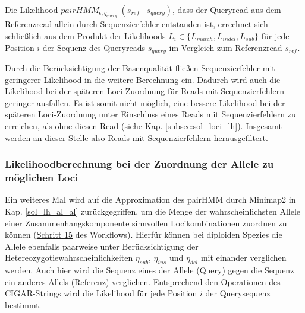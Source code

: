 Die Likelihood $ pairHMM_{\epsilon, q_{query}} \;(s_{ref}\;|\; s_{query}) $, dass der Queryread aus dem Referenzread allein durch Sequenzierfehler entstanden ist, errechnet sich schließlich aus dem Produkt der Likelihoods $ L_{i} \in \{L_{match}, L_{indel}, L_{sub}\} $ für jede Position $ i $ der Sequenz des Queryreads $ s_{query} $ im Vergleich zum Referenzread $ s_{ref} $.
\vspace{-0.5cm}
\begin{center}
\end{center}
 
Durch die Berücksichtigung der Basenqualität fließen Sequenzierfehler mit geringerer Likelihood in die weitere Berechnung ein. Dadurch wird auch die Likelihood bei der späteren Loci-Zuordnung für Reads mit Sequenzierfehlern geringer ausfallen. Es ist somit nicht möglich, eine bessere Likelihood bei der späteren Loci-Zuordnung unter Einschluss eines Reads mit Sequenzierfehlern zu erreichen, als ohne diesen Read (siehe Kap. \ref{subsec:sol_loci_lh}). Insgesamt werden an dieser Stelle also Reads mit Sequenzierfehlern herausgefiltert.

\subsubsection{Likelihoodberechnung bei der Zuordnung der Allele zu möglichen Loci} \label{pHMM_loci}

Ein weiteres Mal wird auf die Approximation des pairHMM durch Minimap2 in Kap. \ref{sol_lh_al_al} zurückgegriffen, um die Menge der wahrscheinlichsten Allele einer Zusammenhangskomponente sinnvollen Locikombinationen zuordnen zu können (\hyperref[step15]{Schritt 15\label{step15txt}} des Workflows). Hierfür können bei diploiden Spezies die Allele ebenfalls paarweise unter Berücksichtigung der Hetereozygotiewahrscheinlichkeiten $\eta_{sub}$, $\eta_{ins}$ und $\eta_{del}$ mit einander verglichen werden. Auch hier wird die Sequenz eines der Allele (Query) gegen die Sequenz ein anderes Allels (Referenz) verglichen. Entsprechend den Operationen des CIGAR-Strings wird die Likelihood für jede Position $i$ der Querysequenz bestimmt. \\


